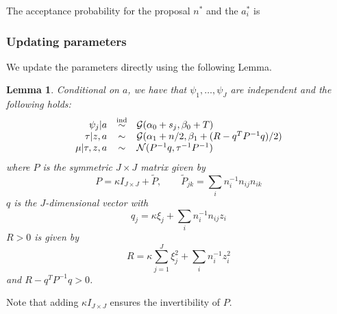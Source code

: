 \documentclass[a4paper,11pt]{article}
\theoremstyle{theorem}
\newtheorem{lem}{Lemma}[section]
\theoremstyle{definition}
\theoremstyle{remark}
\begin{document}
The acceptance probability for the proposal $n^{\ast}$ and the $a_{i}^{\ast}$ is

\subsubsection{Updating parameters}

We update the parameters directly using the following Lemma.

\begin{lem}
Conditional on $a$, we have that $\psi_1, \dotsc, \psi_J$ are independent and the following holds:
\[
\begin{array}{r c l}
\psi_j | a & \overset{\text{ind}}{\sim} & \mathcal{G}(\alpha_0 + s_j, \beta_0 + T) \\
\tau | z, a & \sim & \mathcal{G}(\alpha_1 + n/2, \beta_1 + (R - q^T P^{-1} q)/2) \\
\mu | \tau, z, a & \sim & \mathcal{N}(P^{-1} q, \tau^{-1} P^{-1})
\end{array}
\]
where $P$ is the symmetric $J \times J$ matrix given by
\[
P = \kappa I_{J \times J} + \tilde{P}, \qquad \tilde{P}_{jk} = \sum_{i}{n_{i}^{-1} n_{ij} n_{ik}}
\]
$q$ is the $J$-dimensional vector with
\[
q_j = \kappa \xi_j + \sum_{i}{n_{i}^{-1}n_{ij}z_i}
\]
$R > 0$ is given by
\[
R = \kappa \sum_{j=1}^{J}{\xi_{j}^{2}} + \sum_{i}{n_{i}^{-1} z_{i}^{2}}
\]
and $R - q^T P^{-1} q > 0$. 
\end{lem}

Note that adding $\kappa I_{J \times J}$ ensures the invertibility of $P$.
\end{document}

